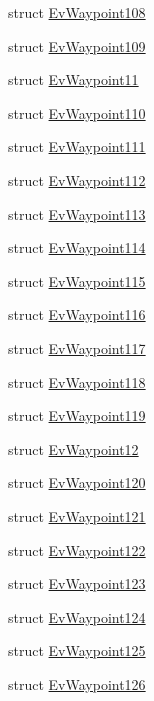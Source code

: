 \begin{DoxyCompactItemize}
struct \hyperlink{structmove__base__z__client_1_1EvWaypoint108}{Ev\+Waypoint108}
\item 
struct \hyperlink{structmove__base__z__client_1_1EvWaypoint109}{Ev\+Waypoint109}
\item 
struct \hyperlink{structmove__base__z__client_1_1EvWaypoint11}{Ev\+Waypoint11}
\item 
struct \hyperlink{structmove__base__z__client_1_1EvWaypoint110}{Ev\+Waypoint110}
\item 
struct \hyperlink{structmove__base__z__client_1_1EvWaypoint111}{Ev\+Waypoint111}
\item 
struct \hyperlink{structmove__base__z__client_1_1EvWaypoint112}{Ev\+Waypoint112}
\item 
struct \hyperlink{structmove__base__z__client_1_1EvWaypoint113}{Ev\+Waypoint113}
\item 
struct \hyperlink{structmove__base__z__client_1_1EvWaypoint114}{Ev\+Waypoint114}
\item 
struct \hyperlink{structmove__base__z__client_1_1EvWaypoint115}{Ev\+Waypoint115}
\item 
struct \hyperlink{structmove__base__z__client_1_1EvWaypoint116}{Ev\+Waypoint116}
\item 
struct \hyperlink{structmove__base__z__client_1_1EvWaypoint117}{Ev\+Waypoint117}
\item 
struct \hyperlink{structmove__base__z__client_1_1EvWaypoint118}{Ev\+Waypoint118}
\item 
struct \hyperlink{structmove__base__z__client_1_1EvWaypoint119}{Ev\+Waypoint119}
\item 
struct \hyperlink{structmove__base__z__client_1_1EvWaypoint12}{Ev\+Waypoint12}
\item 
struct \hyperlink{structmove__base__z__client_1_1EvWaypoint120}{Ev\+Waypoint120}
\item 
struct \hyperlink{structmove__base__z__client_1_1EvWaypoint121}{Ev\+Waypoint121}
\item 
struct \hyperlink{structmove__base__z__client_1_1EvWaypoint122}{Ev\+Waypoint122}
\item 
struct \hyperlink{structmove__base__z__client_1_1EvWaypoint123}{Ev\+Waypoint123}
\item 
struct \hyperlink{structmove__base__z__client_1_1EvWaypoint124}{Ev\+Waypoint124}
\item 
struct \hyperlink{structmove__base__z__client_1_1EvWaypoint125}{Ev\+Waypoint125}
\item 
struct \hyperlink{structmove__base__z__client_1_1EvWaypoint126}{Ev\+Waypoint126}

\end{DoxyCompactItemize}
